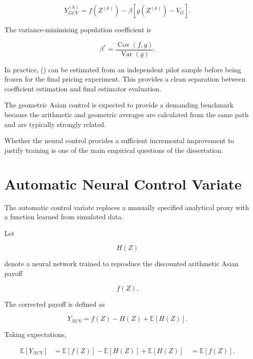 \documentclass[12pt,a4paper]{report}
\begin{document}
\begin{equation}
Y^{(k)}_{GCV}
=
f(Z^{(k)})
-
\beta
\left[
g(Z^{(k)})
-
V_G
\right].
\end{equation}

The variance-minimising population coefficient is

\begin{equation}
\beta^*
=
\frac{
\operatorname{Cov}(f,g)
}{
\operatorname{Var}(g)
}.
\end{equation}

In practice, (\beta) can be estimated from an independent pilot sample before being frozen for the final pricing experiment. This provides a clean separation between coefficient estimation and final estimator evaluation.

The geometric Asian control is expected to provide a demanding benchmark because the arithmetic and geometric averages are calculated from the same path and are typically strongly related.

Whether the neural control provides a sufficient incremental improvement to justify training is one of the main empirical questions of the dissertation.

\section{Automatic Neural Control Variate}

The automatic control variate replaces a manually specified analytical proxy with a function learned from simulated data.

Let

\begin{equation}
H(Z)
\end{equation}

denote a neural network trained to reproduce the discounted arithmetic Asian payoff

\begin{equation}
f(Z).
\end{equation}

The corrected payoff is defined as

\begin{equation}
Y_{NCV}
=
f(Z)
-
H(Z)
+
\mathbb{E}[H(Z)].
\end{equation}

Taking expectations,

\begin{align}
\mathbb{E}[Y_{NCV}]
&=
\mathbb{E}[f(Z)]
-
\mathbb{E}[H(Z)]
+
\mathbb{E}[H(Z)]
\
&=
\mathbb{E}[f(Z)].
\end{align}
\end{document}
